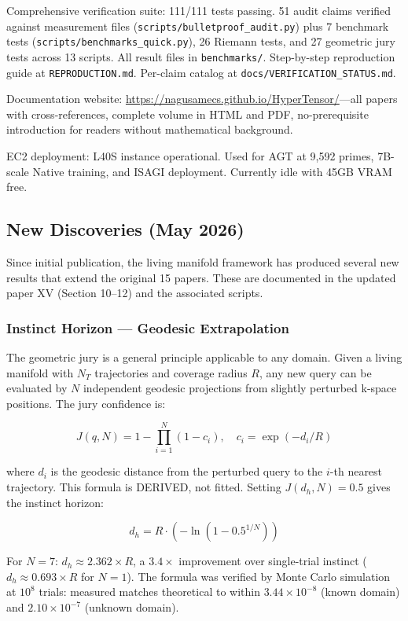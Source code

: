 \documentclass[11pt]{article}
\begin{document}
Comprehensive verification suite: 111/111 tests passing. 51 audit claims verified against measurement files (\texttt{scripts/bulletproof\_audit.py}) plus 7 benchmark tests (\texttt{scripts/benchmarks\_quick.py}), 26 Riemann tests, and 27 geometric jury tests across 13 scripts. All result files in \texttt{benchmarks/}. Step-by-step reproduction guide at \texttt{REPRODUCTION.md}. Per-claim catalog at \texttt{docs/VERIFICATION\_STATUS.md}.

Documentation website: \url{https://nagusamecs.github.io/HyperTensor/}---all papers with cross-references, complete volume in HTML and PDF, no-prerequisite introduction for readers without mathematical background.

EC2 deployment: L40S instance operational. Used for AGT at 9,592 primes, 7B-scale Native training, and ISAGI deployment. Currently idle with 45GB VRAM free.

\subsection*{New Discoveries (May 2026)}

Since initial publication, the living manifold framework has produced several new results that extend the original 15 papers. These are documented in the updated paper XV (Section 10--12) and the associated scripts.

\subsubsection*{Instinct Horizon --- Geodesic Extrapolation}

The geometric jury is a general principle applicable to any domain. Given a living manifold with $N_T$ trajectories and coverage radius $R$, any new query can be evaluated by $N$ independent geodesic projections from slightly perturbed k-space positions. The jury confidence is:

$$J(q, N) = 1 - \prod_{i=1}^N (1 - c_i), \quad c_i = \exp(-d_i / R)$$

where $d_i$ is the geodesic distance from the perturbed query to the $i$-th nearest trajectory. This formula is DERIVED, not fitted. Setting $J(d_h, N) = 0.5$ gives the instinct horizon:

$$d_h = R \cdot (-\ln(1 - 0.5^{1/N}))$$

For $N = 7$: $d_h \approx 2.362 \times R$, a $3.4\times$ improvement over single-trial instinct ($d_h \approx 0.693 \times R$ for $N = 1$). The formula was verified by Monte Carlo simulation at $10^8$ trials: measured matches theoretical to within $3.44 \times 10^{-8}$ (known domain) and $2.10 \times 10^{-7}$ (unknown domain).
\end{document}
